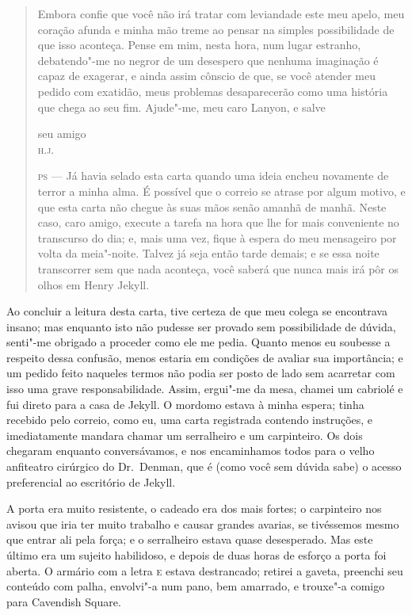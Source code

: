 \begin{quote}
Embora confie que você não irá tratar com leviandade este meu apelo, meu
coração afunda e minha mão treme ao pensar na simples possibilidade de
que isso aconteça.  Pense em mim, nesta hora, num lugar estranho,
debatendo"-me no negror de um desespero que nenhuma imaginação é capaz
de exagerar, e ainda assim cônscio de que, se você atender meu pedido
com exatidão, meus problemas desaparecerão como uma história que chega
ao seu fim.  Ajude"-me, meu caro Lanyon, e salve

{\raggedleft seu amigo\\
\textsc{h.j.} \par}

\textsc{ps} --- Já havia selado esta carta quando uma ideia encheu novamente de
terror a minha alma.  É possível que o correio se atrase por algum
motivo, e que esta carta não chegue às suas mãos senão amanhã de manhã.
 Neste caso, caro amigo, execute a tarefa na hora que lhe for mais
conveniente no transcurso do dia; e, mais uma vez, fique à espera do
meu mensageiro por volta da meia"-noite.  Talvez já seja então tarde
demais; e se essa noite transcorrer sem que nada aconteça, você saberá
que nunca mais irá pôr os olhos em Henry Jekyll.
\end{quote}

Ao concluir a leitura desta carta, tive certeza de que meu colega se
encontrava insano; mas enquanto isto não pudesse ser provado sem
possibilidade de dúvida, senti"-me obrigado a proceder como ele me
pedia.  Quanto menos eu soubesse a respeito dessa confusão, menos
estaria em condições de avaliar sua importância; e um pedido feito
naqueles termos não podia ser posto de lado sem acarretar com isso uma
grave responsabilidade.  Assim, ergui"-me da mesa, chamei um cabriolé e
fui direto para a casa de Jekyll.  O mordomo estava à minha espera;
tinha recebido pelo correio, como eu, uma carta registrada contendo
instruções, e imediatamente mandara chamar um serralheiro e um
carpinteiro.  Os dois chegaram enquanto conversávamos, e nos
encaminhamos todos para o velho anfiteatro cirúrgico do Dr.~Denman, que
é (como você sem dúvida sabe) o acesso preferencial ao escritório de
Jekyll. 

A porta era muito resistente, o cadeado era dos mais fortes; o
carpinteiro nos avisou que iria ter muito trabalho e causar grandes
avarias, se tivéssemos mesmo que entrar ali pela força; e o serralheiro
estava quase desesperado.  Mas este último era um sujeito habilidoso, e
depois de duas horas de esforço a porta foi aberta.  O armário com a
letra \textsc{e} estava destrancado; retirei a gaveta, preenchi seu conteúdo com
palha, envolvi"-a num pano, bem amarrado, e trouxe"-a comigo para
Cavendish Square.

